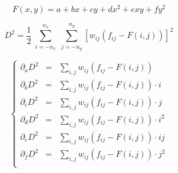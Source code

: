 \documentclass[aps,11pt]{revtex4}
\begin{document}
\begin{equation}
F(x,y) = a + b x + c y + d x^2 + e xy + f y^2
\end{equation}

\begin{equation}
	D^2 = \dfrac{1}{2} \; \sum_{i=-n_x}^{n_x} \; \sum_{j=-n_y}^{n_y} 
	\left[w_{ij} \left(f_{ij} - F(i,j) \right) \right]^2
\end{equation}

\begin{equation}
\left\lbrace
\begin{array}{rcl}
	\partial_a D^2 & = & \displaystyle \sum_{i,j} w_{ij} \left(f_{ij} - F(i,j) \right)   \\
	\partial_b D^2 & = & \displaystyle \sum_{i,j} w_{ij} \left(f_{ij} - F(i,j) \right) \cdot i \\
	\partial_c D^2 & = & \displaystyle \sum_{i,j} w_{ij} \left(f_{ij} - F(i,j) \right) \cdot j \\
 	\partial_d D^2 & = & \displaystyle \sum_{i,j} w_{ij} \left(f_{ij} - F(i,j) \right) \cdot i^2\\
	\partial_e D^2 & = & \displaystyle \sum_{i,j} w_{ij} \left(f_{ij} - F(i,j) \right) \cdot ij\\
	\partial_f D^2 & = & \displaystyle \sum_{i,j} w_{ij} \left(f_{ij} - F(i,j) \right) \cdot j^2 \\
\end{array}
\right.
\end{equation}
\end{document}
